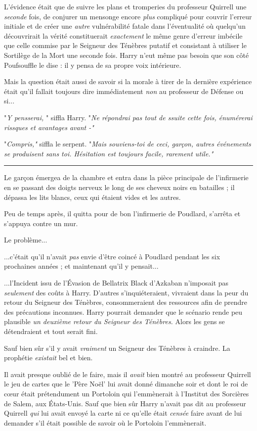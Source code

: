 L'évidence était que de suivre les plans et tromperies du professeur Quirrell une \emph{seconde}  fois, de conjurer un mensonge encore \emph{plus}  compliqué pour couvrir l'erreur initiale et de créer une \emph{autre}  vulnérabilité fatale dans l'éventualité où quelqu'un découvrirait la vérité constituerait \emph{exactement}  le même genre d'erreur imbécile que celle commise par le Seigneur des Ténèbres putatif et consistant à utiliser le Sortilège de la Mort une seconde fois. Harry n'eut même pas besoin que son côté Poufsouffle le dise : il y pensa de sa propre voix intérieure.

Mais la question était aussi de savoir si la morale à tirer de la dernière expérience était qu'il fallait toujours dire immédiatement \emph{non}  au professeur de Défense ou si...

"\emph{Y pensserai,} " siffla Harry. "\emph{Ne répondrai pas tout de ssuite cette fois, énumérerai rissques et avantages avant -"} 

"\emph{Compris,"}  siffla le serpent. "\emph{Mais souviens-toi de ceci, garçon, autres événements se produisent sans toi. Hésitation est toujours facile, rarement utile."} 
\par\noindent\rule{\textwidth}{0.4pt}
Le garçon émergea de la chambre et entra dans la pièce principale de l'infirmerie en se passant des doigts nerveux le long de ses cheveux noirs en batailles ; il dépassa les lits blancs, ceux qui étaient vides et les autres.

Peu de temps après, il quitta pour de bon l'infirmerie de Poudlard, s'arrêta et s'appuya contre un mur.

Le problème...

...c'était qu'il n'avait \emph{pas}  envie d'être coincé à Poudlard pendant les six prochaines années ; et maintenant qu'il y pensait...

...l'Incident issu de l'Évasion de Bellatrix Black d'Azkaban n'imposait pas \emph{seulement}  des coûts à Harry. D'autres s'inquiéteraient, vivraient dans la peur du retour du Seigneur des Ténèbres, consommeraient des ressources afin de prendre des précautions inconnues. Harry pourrait demander que le scénario rende peu plausible \emph{un deuxième retour du Seigneur des Ténèbres.}  Alors les gens se détendraient et tout serait fini.

Sauf bien sûr s'il y avait \emph{vraiment}  un Seigneur des Ténèbres à craindre. La prophétie \emph{existait } bel et bien.

Il avait presque oublié de le faire, mais il \emph{avait } bien montré au professeur Quirrell le jeu de cartes que le 'Père Noël' lui avait donné dimanche soir et dont le roi de cœur était prétendument un Portoloin qui l'emmènerait à l'Institut des Sorcières de Salem, aux États-Unis. Sauf que bien sûr Harry n'avait pas dit au professeur Quirrell \emph{qui}  lui avait envoyé la carte ni ce qu'elle était \emph{censée}  faire avant de lui demander s'il était possible de savoir où le Portoloin l'emmènerait.

